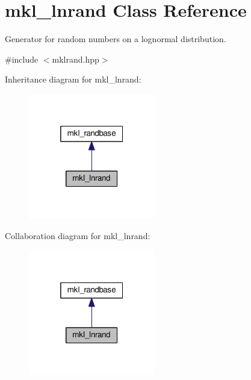 \hypertarget{classmkl__lnrand}{}\section{mkl\+\_\+lnrand Class Reference}
\label{classmkl__lnrand}


Generator for random numbers on a lognormal distribution.  




{\ttfamily \#include $<$mklrand.\+hpp$>$}



Inheritance diagram for mkl\+\_\+lnrand\+:
\nopagebreak
\begin{figure}[H]
\begin{center}
\leavevmode
\includegraphics[width=157pt]{d0/df6/classmkl__lnrand__inherit__graph}
\end{center}
\end{figure}


Collaboration diagram for mkl\+\_\+lnrand\+:
\nopagebreak
\begin{figure}[H]
\begin{center}
\leavevmode
\includegraphics[width=157pt]{d0/dfe/classmkl__lnrand__coll__graph}
\end{center}
\end{figure}
